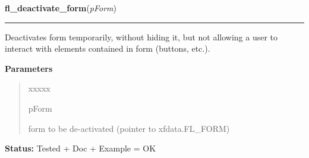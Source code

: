 \hspace{.8\funcindent}\begin{boxedminipage}{\funcwidth}

    \raggedright \textbf{fl\_deactivate\_form}(\textit{pForm})

    \vspace{-1.5ex}

    \rule{\textwidth}{0.5\fboxrule}
\setlength{\parskip}{2ex}
    Deactivates form temporarily, without hiding it, but not allowing a 
    user to interact with elements contained in form (buttons, etc.).

\setlength{\parskip}{1ex}
      \textbf{Parameters}
      \vspace{-1ex}

      \begin{quote}
        \begin{Ventry}{xxxxx}

          \item[pForm]

          form to be de-activated (pointer to xfdata.FL\_FORM)

        \end{Ventry}

      \end{quote}

\textbf{Status:} Tested + Doc + Example = OK



    \end{boxedminipage}

    \label{xformslib:library:fl_activate_form}

    \vspace{0.5ex}


